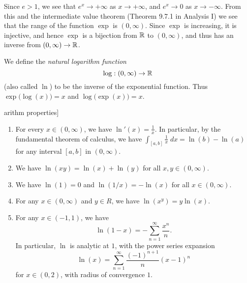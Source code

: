 \begin{note}
  Since \(e > 1\), we see that \(e^x \to +\infty\) as \(x \to +\infty\), and \(e^x \to 0\) as \(x \to -\infty\).
  From this and the intermediate value theorem (Theorem 9.7.1 in Analysis I) we see that the range of the function \(\exp\) is \((0, \infty)\).
  Since \(\exp\) is increasing, it is injective, and hence \(\exp\) is a bijection from \(\mathbb{R}\) to \((0, \infty)\), and thus has an inverse from \((0, \infty) \to \mathbb{R}\).
\end{note}

\begin{defn}[Logarithm]\label{4.5.5}
  We define the \emph{natural logarithm function}
  \[
    \log : (0, \infty) \to \mathbb{R}
  \]
  (also called \(\ln\)) to be the inverse of the exponential function.
  Thus \(\exp\big(\log(x)\big) = x\) and \(\log\big(\exp(x)\big) = x\).
\end{defn}

\begin{thm}arithm properties]\label{4.5.6}
  \quad
  \begin{enumerate}
    \item For every \(x \in (0, \infty)\), we have \(\ln'(x) = \frac{1}{x}\).
          In particular, by the fundamental theorem of calculus, we have \(\int_{[a, b]} \frac{1}{x} \; dx = \ln(b) - \ln(a)\) for any interval \([a, b]\) in \((0, \infty)\).
    \item We have \(\ln(xy) = \ln(x) + \ln(y)\) for all \(x, y \in (0, \infty)\).
    \item We have \(\ln(1) = 0\) and \(\ln(1 / x) = -\ln(x)\) for all \(x \in (0, \infty)\).
    \item For any \(x \in (0, \infty)\) and \(y \in R\), we have \(\ln(x^y) = y \ln(x)\).
    \item For any \(x \in (-1, 1)\), we have
          \[
            \ln(1 - x) = - \sum_{n = 1}^\infty \frac{x^n}{n}.
          \]
          In particular, \(\ln\) is analytic at \(1\), with the power series expansion
          \[
            \ln(x) = \sum_{n = 1}^\infty \frac{(-1)^{n + 1}}{n} (x - 1)^n
          \]
          for \(x \in (0, 2)\), with radius of convergence \(1\).
  \end{enumerate}
\end{thm}

